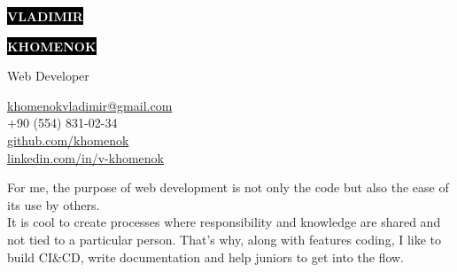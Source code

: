 \documentclass[10pt]{template}
\begin{document}
\begin{minipage}[t]{0.55\textwidth}
	\vspace{-\baselineskip}
		
	\colorbox{black}{{\HUGE\textcolor{white}{\textbf{\MakeUppercase{Vladimir}}}}}
		
	\colorbox{black}{{\HUGE\textcolor{white}{\textbf{\MakeUppercase{Khomenok}}}}}
		
	\vspace{6pt}
		
	{\huge Web Developer}
\end{minipage}
\begin{minipage}[t]{0.325\textwidth}
		
	\vspace{-\baselineskip}	
	\href{mailto:khomenokvladimir@gmail.com}{khomenokvladimir@gmail.com}\\
	+90 (554) 831-02-34\\ 
		
	\href{https://github.com/khomenok}{{\color{gray}github.com/}khomenok}\\
	\href{https://linkedin.com/in/v-khomenok}{{\color{gray}linkedin.com/in/}v-khomenok}
\end{minipage}

\vspace{1cm}

For me, the purpose of web development is not only the code but also the ease of its use by others.\\
It is cool to create processes where responsibility and knowledge are shared and not tied to a particular person. That's why, along with features coding, I like to build CI\&CD, write documentation and help juniors to get into the flow. \\


\end{document}
